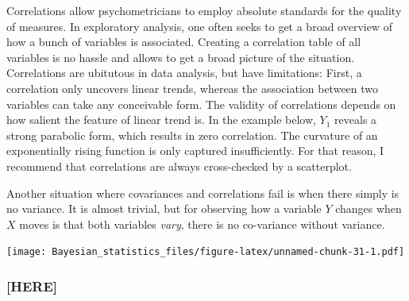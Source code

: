 \documentclass[]{svmono}
\newenvironment{Shaded}{\begin{snugshade}}{\end{snugshade}}
\newcommand{\KeywordTok}[1]{\textcolor[rgb]{0.13,0.29,0.53}{\textbf{#1}}}
\newcommand{\DataTypeTok}[1]{\textcolor[rgb]{0.13,0.29,0.53}{#1}}
\newcommand{\DecValTok}[1]{\textcolor[rgb]{0.00,0.00,0.81}{#1}}
\newcommand{\StringTok}[1]{\textcolor[rgb]{0.31,0.60,0.02}{#1}}
\newcommand{\OperatorTok}[1]{\textcolor[rgb]{0.81,0.36,0.00}{\textbf{#1}}}
\newcommand{\NormalTok}[1]{#1}
\theoremstyle{definition}
\theoremstyle{definition}
\theoremstyle{definition}
\theoremstyle{remark}
\begin{document}
Correlations allow psychometricians to employ absolute standards for the
quality of measures. In exploratory analysis, one often seeks to get a
broad overview of how a bunch of variables is associated. Creating a
correlation table of all variables is no hassle and allows to get a
broad picture of the situation. Correlations are ubitutous in data
analysis, but have limitations: First, a correlation only uncovers
linear trends, whereas the association between two variables can take
any conceivable form. The validity of correlations depends on how
salient the feature of linear trend is. In the example below, \(Y_1\)
reveals a strong parabolic form, which results in zero correlation. The
curvature of an exponentially rising function is only captured
insufficiently. For that reason, I recommend that correlations are
always cross-checked by a scatterplot.

Another situation where covariances and correlations fail is when there
simply is no variance. It is almost trivial, but for observing how a
variable \(Y\) changes when \(X\) moves is that both variables
\emph{vary}, there is no co-variance without variance.

\begin{Shaded}
\end{Shaded}

\texttt{[image: Bayesian\_statistics\_files/figure-latex/unnamed-chunk-31-1.pdf]}

\subsubsection{{[}HERE{]}}\label{here}
\end{document}
